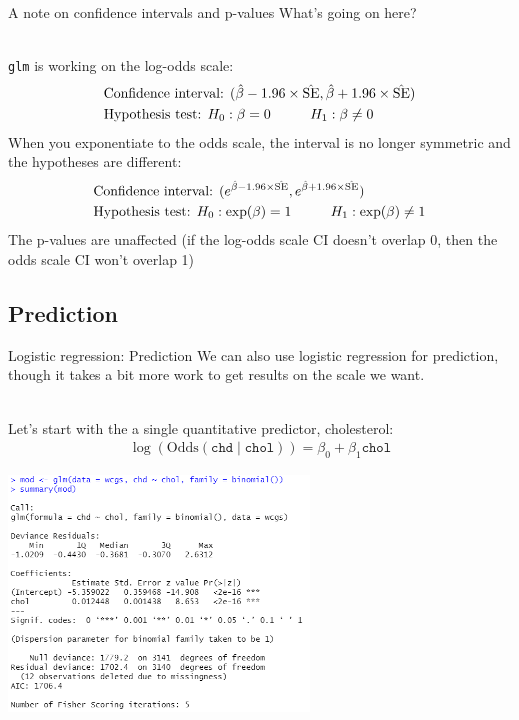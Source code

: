\documentclass[10pt,t]{beamer}
\newcommand\tab[1][1cm]{\hspace*{#1}}
\begin{document}
\begin{frame}{A note on confidence intervals and p-values}
	What's going on here? 
	\\ ~\
	
	\texttt{glm} is working on the log-odds scale:
	\begin{align*}
		&\text{Confidence interval: }(\hat{\beta} - 1.96 \times \hat{\text{SE}}, \hat{\beta} + 1.96 \times \hat{\text{SE}})\\
		&\text{Hypothesis test: }H_0: \beta = 0 \tab H_1: \beta \neq 0
	\end{align*}
	When you exponentiate to the odds scale, the interval is no longer symmetric and the hypotheses are different:
	\begin{align*}
		&\text{Confidence interval: }(e^{\hat{\beta} - 1.96 \times \hat{\text{SE}}}, e^{\hat{\beta} + 1.96 \times \hat{\text{SE}}})\\
		&\text{Hypothesis test: }H_0: \exp(\beta) = 1 \tab H_1: \exp(\beta) \neq 1
	\end{align*} 
	The p-values are unaffected (if the log-odds scale CI doesn't overlap 0, then the odds scale CI won't overlap 1)
\end{frame}


\subsection{Prediction}
\begin{frame}{Logistic regression: Prediction}
	We can also use logistic regression for prediction, though it takes a bit more work to get results on the scale we want. 
	\\ ~\
	
	Let's start with the a single quantitative predictor, cholesterol:
	\begin{align*}
		\log(\text{Odds}(\texttt{chd} \mid \texttt{chol})) = \beta_0 + \beta_1 \texttt{chol}
	\end{align*}
	\begin{center}
	\includegraphics[width=0.6\textwidth]{./figs/simple_logistic_regression_chol}
\end{center}
\end{frame}
\end{document}
